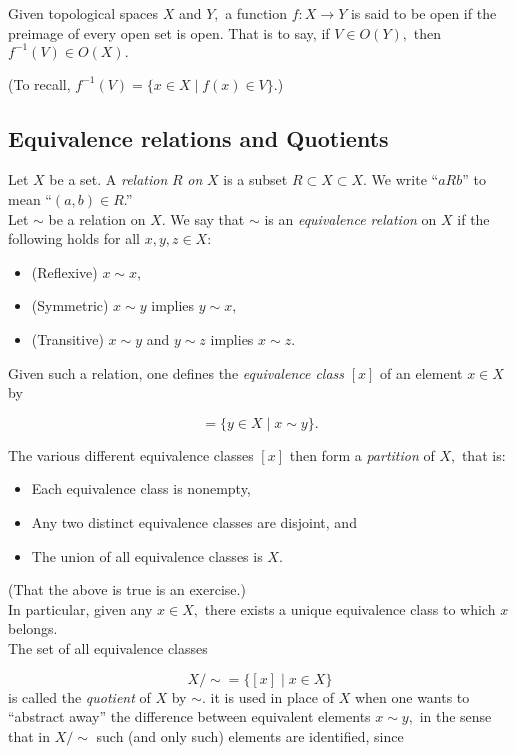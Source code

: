 Given topological spaces $X$ and $Y,$ a function $f:X\to Y$ is said to be open if the preimage of every open set is open. That is to say, if $V \in O(Y),$ then $f^{-1}(V) \in O(X).$

(To recall, $f^{-1}(V) = \{x \in X \mid f(x) \in V\}.$)
%
\subsection{Equivalence relations and Quotients} \label{equivrel}
Let $X$ be a set. A \emph{relation} $R$ \emph{on} $X$ is a subset $R \subset X \subset X.$ We write ``$aRb$'' to mean ``$(a, b) \in R$.''\\
Let $\sim$ be a relation on $X.$ We say that $\sim$ is an \emph{equivalence relation} on $X$ if the following holds for all $x, y, z \in X:$
\begin{itemize}
	\item (Reflexive) $x \sim x,$
	\item (Symmetric) $x \sim y$ implies $y \sim x,$
	\item (Transitive) $x \sim y$ and $y \sim z$ implies $x \sim z.$
\end{itemize}
Given such a relation, one defines the \emph{equivalence class} $[x]$ of an element $x \in X$ by

\begin{equation*} 
	[x] = \{y \in  X \mid x \sim y\}.
\end{equation*}

The various different equivalence classes $[x]$ then form a \emph{partition} of $X,$ that is:
\begin{itemize}
	\item Each equivalence class is nonempty,
	\item Any two distinct equivalence classes are disjoint, and
	\item The union of all equivalence classes is $X.$
\end{itemize}
(That the above is true is an exercise.)\\
In particular, given any $x \in X,$ there exists a unique equivalence class to which $x$ belongs.\\
The set of all equivalence classes

\begin{equation*} 
	X/\sim = \{[x] \mid x \in X\}
\end{equation*}
is called the \emph{quotient} of $X$ by $\sim.$ it is used in place of $X$ when one wants to ``abstract away'' the difference between equivalent elements $x \sim y,$ in the sense that in $X/\sim$ such (and only such) elements are identified, since

